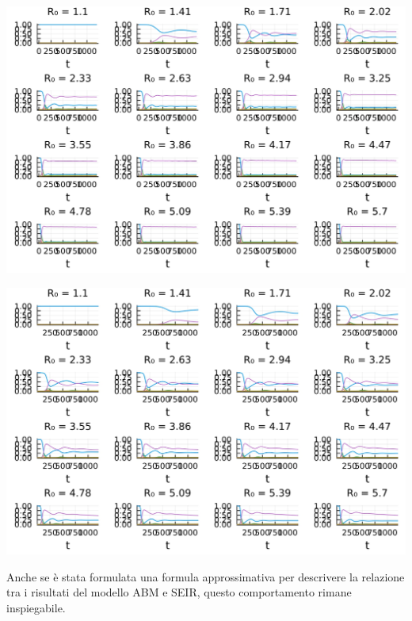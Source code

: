 \begin{minipage}{\linewidth}
    \centering
    \includegraphics[width=\textwidth]{img/COMPARISON DIFFERENT R0 VALUE_2023-06-29.jpg}
    \label{fig:strange_behaviour_R0_abm}
\end{minipage}

\begin{minipage}{\linewidth}
    \centering
    \includegraphics[width=\textwidth]{img/COMPARISON DIFFERENT R0 VALUE_2023-06-29 (1).jpg}
    \label{fig:strange_behaviour_R0_ode}
\end{minipage}

Anche se è stata formulata una formula approssimativa per 
descrivere la relazione tra i risultati del modello ABM e SEIR, 
questo comportamento rimane inspiegabile. 

